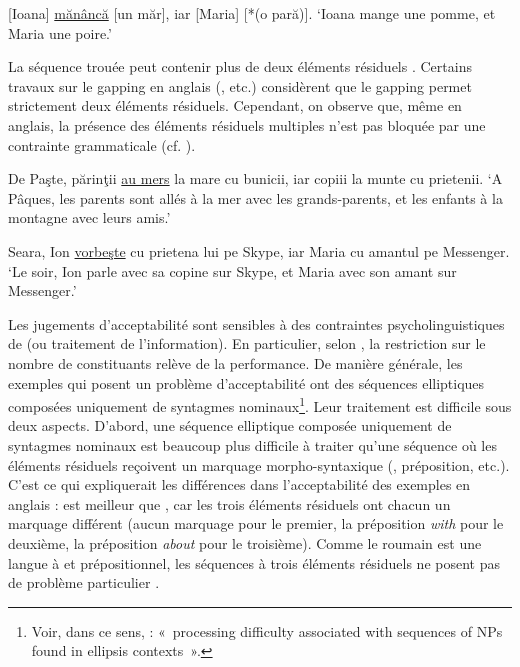\ea {}
[Ioana] \uline{mănâncă} [un măr], iar [Maria] [*(o pară)].\label{ch2:ex110}
\glt ‘Ioana mange une pomme, et Maria une poire.’    
\z

La séquence trouée peut contenir plus de deux éléments résiduels . Certains travaux sur le gapping en anglais (\citealt{Jackendoff1971,Kuno1976,Haspelmath2007}, etc.) considèrent que le gapping permet strictement deux éléments résiduels. Cependant, on observe que, même en anglais, la présence des éléments résiduels multiples n’est pas bloquée par une contrainte grammaticale (cf. \citealt{Kuno1976,SagEtAl1985,Zribi-Hertz1986,Steedman1990}).

\ea \label{ch2:ex111}
\ea De Paşte, părinţii \uline{au mers} la mare cu bunicii, iar copiii la munte cu prietenii.
\glt ‘A Pâques, les parents sont allés à la mer avec les grands-parents, et les enfants à la montagne avec leurs amis.’

\ex  Seara, Ion \uline{vorbeşte} cu prietena lui pe Skype, iar Maria cu amantul pe Messenger.
\glt  ‘Le soir, Ion parle avec sa copine sur Skype, et Maria avec son amant sur Messenger.’ 
\z
\z

Les jugements d’acceptabilité sont sensibles à des contraintes psycholinguistiques de  (ou traitement de l’information). En particulier, selon \citet{Zribi-Hertz1986}, la restriction sur le nombre de constituants relève de la performance. De manière générale, les exemples qui posent un problème d’acceptabilité ont des séquences elliptiques composées uniquement de syntagmes nominaux\footnote{
 Voir, dans ce sens, \citet[157]{SagEtAl1985} : «~processing difficulty associated with sequences of NPs found in ellipsis contexts~».}. Leur traitement est difficile sous deux aspects. D’abord, une séquence elliptique composée uniquement de syntagmes nominaux est beaucoup plus difficile à traiter qu’une séquence où les éléments résiduels reçoivent un marquage morpho-syntaxique (, préposition, etc.). C’est ce qui expliquerait les différences dans l’acceptabilité des exemples  en anglais :  est meilleur que , car les trois éléments résiduels ont chacun un marquage différent (aucun marquage pour le premier, la préposition \textit{with} pour le deuxième, la préposition \textit{about} pour le troisième). Comme le roumain est une langue à  et prépositionnel, les séquences à trois éléments résiduels ne posent pas de problème particulier . 

